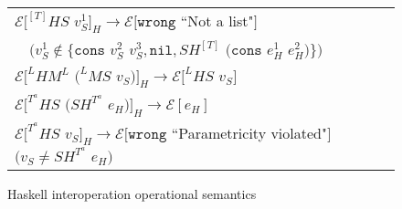 \begin{figure}[p]
\begin{tabular}{l}
\vspace{5pt}

$\mathscr{E}[^{[T]}HS$ $v_{S}^{1}]_{H}\rightarrow\mathscr{E}[\mathtt{wrong}$ ``Not a list"$]$ \\

\vspace{5pt}

$\quad(v_{S}^{1}\not\in\lbrace\mathtt{cons}$ $v_{S}^{2}$ $v_{S}^{3},\mathtt{nil},SH^{[T]}$ $(\mathtt{cons}$ $e_{H}^{1}$ $e_{H}^{2})\rbrace)$ \\

\vspace{5pt}

$\mathscr{E}[^{L}HM^{L}$ $(^{L}MS$ $v_{S})]_{H}\rightarrow\mathscr{E}[^{L}HS$ $v_{S}]$ \\

\vspace{5pt}

$\mathscr{E}[^{T^{a}}HS$ $(SH^{T^{a}}$ $e_{H})]_{H}\rightarrow\mathscr{E}[e_{H}]$ \\

\vspace{5pt}

$\mathscr{E}[^{T^{a}}HS$ $v_{S}]_{H}\rightarrow\mathscr{E}[\mathtt{wrong}$ ``Parametricity violated"$]$ $(v_{S}\neq SH^{T^{a}}$ $e_{H})$ \\
\end{tabular}
\caption{Haskell interoperation operational semantics}
\label{ihos}
\end{figure}